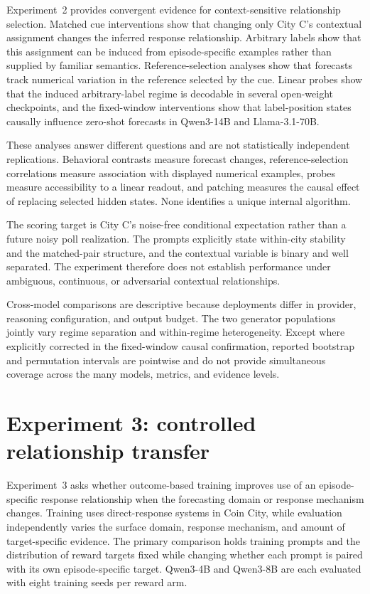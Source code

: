 Experiment~2 provides convergent evidence for context-sensitive relationship selection.
Matched cue interventions show that changing only City C's contextual assignment changes the inferred response relationship.
Arbitrary labels show that this assignment can be induced from episode-specific examples rather than supplied by familiar semantics.
Reference-selection analyses show that forecasts track numerical variation in the reference selected by the cue.
Linear probes show that the induced arbitrary-label regime is decodable in several open-weight checkpoints, and the fixed-window interventions show that label-position states causally influence zero-shot forecasts in Qwen3-14B and Llama-3.1-70B.

These analyses answer different questions and are not statistically independent replications.
Behavioral contrasts measure forecast changes, reference-selection correlations measure association with displayed numerical examples, probes measure accessibility to a linear readout, and patching measures the causal effect of replacing selected hidden states.
None identifies a unique internal algorithm.

The scoring target is City C's noise-free conditional expectation rather than a future noisy poll realization.
The prompts explicitly state within-city stability and the matched-pair structure, and the contextual variable is binary and well separated.
The experiment therefore does not establish performance under ambiguous, continuous, or adversarial contextual relationships.

Cross-model comparisons are descriptive because deployments differ in provider, reasoning configuration, and output budget.
The two generator populations jointly vary regime separation and within-regime heterogeneity.
Except where explicitly corrected in the fixed-window causal confirmation, reported bootstrap and permutation intervals are pointwise and do not provide simultaneous coverage across the many models, metrics, and evidence levels.
\clearpage

\section{Experiment 3: controlled relationship transfer}
\label{app:exp3}

Experiment~3 asks whether outcome-based training improves use of an episode-specific response relationship when the forecasting domain or response mechanism changes.
Training uses direct-response systems in Coin City, while evaluation independently varies the surface domain, response mechanism, and amount of target-specific evidence.
The primary comparison holds training prompts and the distribution of reward targets fixed while changing whether each prompt is paired with its own episode-specific target.
Qwen3-4B and Qwen3-8B are each evaluated with eight training seeds per reward arm.

